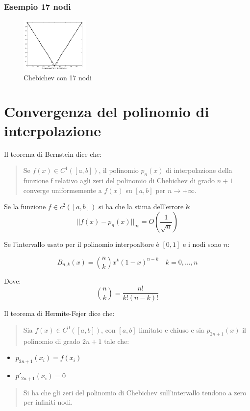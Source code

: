 \subsubsection{Esempio 17 nodi}
\begin{figure}[h!]
  \begin{center}
    \includegraphics[width=0.3\textwidth]{./images/17_nodi_chebichev.png}
  \end{center}
  \caption{Chebichev con 17 nodi}
  \label{fig:chebichev_17_nodi}
\end{figure}

\section{Convergenza del polinomio di interpolazione}

Il teorema di Bernstein dice che:
\begin{quote}
Se $f(x) \in C^1([a, b])$, il polinomio $p_n(x)$ di interpolazione della funzione f relativo
agli zeri del polinomio di Chebichev di grado $n + 1$ converge uniformemente a $f(x)$ su
$[a, b]$ per $n \rightarrow +\infty$.
\end{quote}



Se la funzione $f \in c^2([a, b])$ si ha che la stima dell'errore è:
\begin{equation}
  || f(x) - p_n(x) ||_{\infty} = O(\displaystyle\frac{1}{\sqrt{n}})
\end{equation}


Se l'intervallo usato per il polinomio interpoaltore è $[0, 1]$ e i nodi sono $n$:

\begin{equation}
  B_{n,k}(x) = \binom{n}{k} x^k (1 - x)^{n - k} \quad k = 0, \dots, n
\end{equation}

Dove:
\begin{equation}
  \binom{n}{k} = \displaystyle\frac{n!}{k! (n - k)!}
\end{equation}


Il teorema di Hermite-Fejer dice che:
\begin{quote}
  Sia $f(x) \in C^0([a, b])$, con $[a, b]$ limitato e chiuso e sia $p_{2n+1}(x)$ 
  il polinomio di grado $2n + 1$ tale che:
\end{quote}
\begin{itemize}
  \item $p_{2n+1}(x_i) = f(x_i)$
  \item $p'_{2n+1}(x_i) = 0$
\end{itemize}


\begin{quote}
  Si ha che gli zeri del polinomio di Chebichev sull'intervallo tendono a zero per infiniti nodi.
\end{quote}
